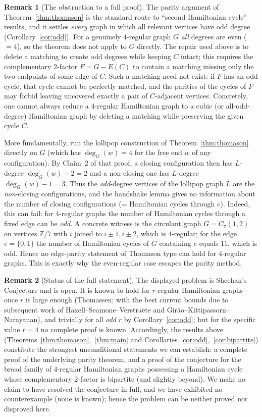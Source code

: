 \documentclass{amsart}
\theoremstyle{plain}
\theoremstyle{definition}
\newtheorem{remark}{Remark}
\begin{document}
\begin{remark}[The obstruction to a full proof]\label{rem:obstruction}
The parity argument of Theorem~\ref{thm:thomason} is the standard route to
``second Hamiltonian cycle'' results, and it settles \emph{every} graph in which
all relevant vertices have odd degree (Corollary~\ref{cor:odd}).  For a genuinely
$4$-regular graph $G$ \emph{all} degrees are even ($=4$), so the theorem does not
apply to $G$ directly.  The repair used above is to delete a matching to create
odd degrees while keeping $C$ intact; this requires the complementary
$2$-factor $F=G-E(C)$ to contain a matching missing only the two endpoints of
some edge of $C$.  Such a matching need not exist: if $F$ has an odd cycle, that
cycle cannot be perfectly matched, and the parities of the cycles of $F$ may
forbid leaving uncovered exactly a pair of $C$-adjacent vertices.  Concretely,
one cannot always reduce a $4$-regular Hamiltonian graph to a cubic (or
all-odd-degree) Hamiltonian graph by deleting a matching while preserving the
given cycle $C$.

More fundamentally, run the lollipop construction of
Theorem~\ref{thm:thomason} directly on $G$ (which has $\deg_G(w)=4$ for the free
end $w$ of any configuration).  By Claim~2 of that proof, a closing
configuration then has $L$-degree $\deg_G(w)-2=2$ and a non-closing one has
$L$-degree $\deg_G(w)-1=3$.  Thus the \emph{odd}-degree vertices of the lollipop
graph $L$ are the \emph{non}-closing configurations, and the handshake lemma
gives no information about the number of closing configurations (= Hamiltonian
cycles through $e$).  Indeed, this can fail: for $4$-regular graphs the number of Hamiltonian
cycles through a fixed edge can be \emph{odd}.  A concrete witness is the
circulant graph $G=C_7(1,2)$ on vertices $\mathbb{Z}/7$ with $i$ joined to
$i\pm1,i\pm2$, which is $4$-regular; for the edge $e=\{0,1\}$ the number of
Hamiltonian cycles of $G$ containing $e$ equals $11$, which is odd.  Hence no
edge-parity statement of Thomason type can hold for $4$-regular graphs.  This is exactly why the
even-regular case escapes the parity method.
\end{remark}

\begin{remark}[Status of the full statement]
The displayed problem is Sheehan's Conjecture and is open.  It is known to hold
for $r$-regular Hamiltonian graphs once $r$ is large enough (Thomassen; with the
best current bounds due to subsequent work of Haxell--Seamone--Verstra\"ete and
Girão--Kittipassorn--Narayanan), and trivially for all \emph{odd} $r$ by
Corollary~\ref{cor:odd}; but for the specific value $r=4$ no complete proof is
known.  Accordingly, the results above
(Theorems~\ref{thm:thomason},~\ref{thm:main} and
Corollaries~\ref{cor:odd},~\ref{cor:bipartite}) constitute the strongest
unconditional statements we can establish: a complete proof of the underlying
parity theorem, and a proof of the conjecture for the broad family of
$4$-regular Hamiltonian graphs possessing a Hamiltonian cycle whose
complementary $2$-factor is bipartite (and slightly beyond).  We make no claim
to have resolved the conjecture in full, and we have exhibited no counterexample
(none is known); hence the problem can be neither proved nor disproved here.
\end{remark}
\end{document}
